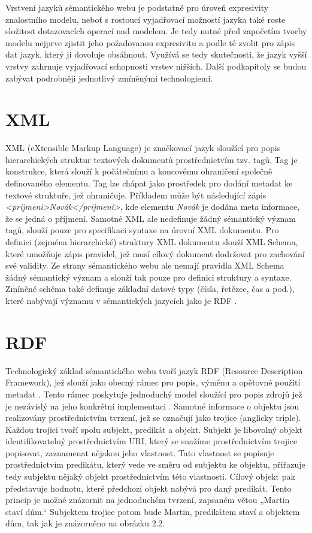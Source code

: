 \documentclass{projekt}
\begin{document}
Vrstvení jazyků sémantického webu je podstatné pro úroveň expresivity znalostního modelu, neboť s rostoucí vyjadřovací možností jazyka také roste složitost dotazovacích operací nad modelem. Je tedy nutné před započetím tvorby modelu nejprve zjistit jeho požadovanou expresivitu a podle té zvolit pro zápis dat jazyk, který ji dovoluje obsáhnout. Využívá se tedy skutečnosti, že jazyk vyšší vrstvy zahrnuje vyjadřovací schopnosti vrstev nižších\cite{_2}. 
Další podkapitoly se budou zabývat podrobněji jednotlivý zmíněnými technologiemi.

\section{XML}
\hspace{0.65cm}XML (eXtensible Markup Language) je značkovací jazyk sloužící pro popis hierarchických struktur textových dokumentů prostřednictvím tzv. tagů. Tag je konstrukce, která slouží k počátečnímu a koncovému ohraničení společně definovaného elementu. Tag lze chápat jako prostředek pro dodání metadat ke textové struktuře, jež ohraničuje. Příkladem může být následující zápis {\it <prijmeni>Novák</prijmeni>}, kde elementu {\it Novák} je dodána meta informace, že se jedná o příjmení. Samotné XML ale nedefinuje žádný sémantický význam tagů, slouží pouze pro specifikaci syntaxe na úrovní XML dokumentu. Pro definici (zejména hierarchické) struktury XML dokumentu slouží XML Schema, které umožňuje zápis pravidel, jež musí cílový dokument dodržovat pro zachování své validity. Ze strany sémantického webu ale nemají pravidla XML Schema žádný sémantický význam a slouží tak pouze pro definici struktury a syntaxe. Zmíněné schéma také definuje základní datové typy (čísla, řetězce, čas a pod.), které nabývají významu v sémantických jazycích jako je RDF \cite{_3}.


\section{RDF}
\hspace{0.65cm}Technologický základ sémantického webu tvoří jazyk RDF (Resource Description Framework), jež slouží jako obecný rámec pro popis, výměnu a opětovné použití metadat \cite{_33}. Tento rámec poskytuje jednoduchý model sloužící pro popis zdrojů jež je nezávislý na jeho konkrétní implementaci \cite{_4}. Samotné informace o objektu jsou realizovány prostřednictvím tvrzení, jež se označují jako trojice (anglicky triple). Každou trojici tvoří spolu subjekt, predikát a objekt. Subjekt je libovolný objekt identifikovatelný prostřednictvím URI, který se snažíme prostřednictvím trojice popisovat, zaznamenat nějakou jeho vlastnost. Tato vlastnost se popisuje prostřednictvím predikátu, který vede ve směru od subjektu ke objektu, přiřazuje tedy subjektu nějaký objekt prostřednictvím této vlastnosti. Cílový objekt pak představuje hodnotu, které předchozí objekt nabývá pro daný predikát. 
Tento princip je možné znázornit na jednoduchém tvrzení, zapsaném větou „Martin staví dům.“ Subjektem trojice potom bude Martin, predikátem staví a objektem dům, tak jak je znázorněno na obrázku 2.2. 
\\
\vspace{0.1cm}
\end{document}
